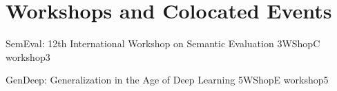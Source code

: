 \chapter[Workshops and Colocated Events: \daydate]{Workshops and Colocated Events}
\thispagestyle{emptyheader}
\vfill







\begin{wsschedule}
  {SemEval: 12th International Workshop on Semantic Evaluation}
  {3}{WShopC}
  {workshop3}
  {\WShopLocC}
  
\end{wsschedule}




\begin{wsschedule}
  {GenDeep: Generalization in the Age of Deep Learning}
  {5}{WShopE}
  {workshop5}
  {\WShopLocE}
  
\end{wsschedule}

%   


